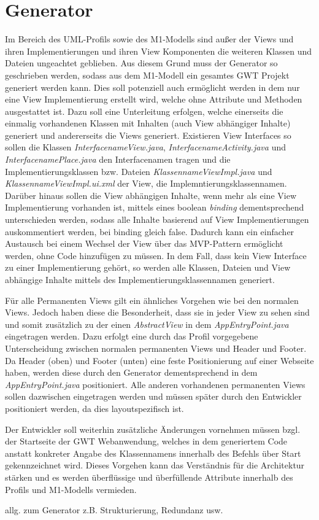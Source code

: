 \section{Generator}\label{AufBGenerator}
Im Bereich des UML-Profils sowie des M1-Modells sind außer der Views und ihren
Implementierungen und ihren View Komponenten die weiteren Klassen und Dateien
ungeachtet geblieben. Aus diesem Grund muss der Generator so geschrieben werden,
sodass aus dem M1-Modell ein gesamtes GWT Projekt generiert werden kann. Dies
soll potenziell auch ermöglicht werden in dem nur eine View Implementierung
erstellt wird, welche ohne Attribute und Methoden ausgestattet ist. Dazu soll
eine Unterleitung erfolgen, welche einerseits die einmalig vorhandenen Klassen
mit Inhalten (auch View abhängiger Inhalte) generiert und andererseits die Views
generiert. Existieren View Interfaces so sollen die Klassen \textit{\grqq{}Interfacename\grqq{}View.java},
\textit{\grqq{}Interfacename\grqq{}Activity.java} und
\textit{\grqq{}Interfacename\grqq{}Place.java} den Interfacenamen tragen und die
Implementierungsklassen bzw. Dateien
\textit{\grqq{}Klassenname\grqq{}ViewImpl.java} und
\textit{\grqq{}Klassenname\grqq{}ViewImpl.ui.xml} der View, die
Implemntierungsklassennamen. Darüber hinaus sollen die View abhängigen Inhalte,
wenn mehr als eine View Implementierung vorhanden ist, mittels eines boolean
\textit{binding} dementsprechend unterschieden werden, sodass alle Inhalte
basierend auf View Implementierungen auskommentiert werden, bei binding gleich
false. Dadurch kann ein einfacher Austausch bei einem Wechsel
der View über das MVP-Pattern ermöglicht werden, ohne Code hinzufügen zu müssen.
In dem Fall, dass kein View Interface zu einer Implementierung gehört, so werden
alle Klassen, Dateien und View abhängige Inhalte mittels des
Implementierungsklassennamen generiert.

Für alle Permanenten Views gilt ein
ähnliches Vorgehen wie bei den normalen Views. Jedoch haben diese die
Besonderheit, dass sie in jeder View zu sehen sind und somit zusätzlich zu der
einen \textit{AbstractView} in dem \textit{AppEntryPoint.java} eingetragen
werden. Dazu erfolgt eine durch das Profil vorgegebene Unterscheidung zwischen
normalen permanenten Views und Header und Footer. Da Header (oben) und Footer
(unten) eine feste Positionierung auf einer Webseite haben, werden diese durch
den Generator dementsprechend in dem \textit{AppEntryPoint.java} positioniert.
Alle anderen vorhandenen permanenten Views sollen dazwischen eingetragen werden
und müssen später durch den Entwickler positioniert werden, da dies
layoutspezifisch ist.

Der Entwickler soll weiterhin zusätzliche Änderungen vornehmen müssen bzgl. der Startseite der GWT
Webanwendung, welches in dem generiertem Code anstatt
konkreter Angabe des Klassennamens innerhalb des Befehls über
\grqq{}Start\grqq{} gekennzeichnet wird. Dieses Vorgehen kann das Verständnis
für die Architektur stärken und es werden überflüssige und überfüllende
Attribute innerhalb des Profils und M1-Modells vermieden.

allg. zum Generator z.B. Strukturierung, Redundanz usw.